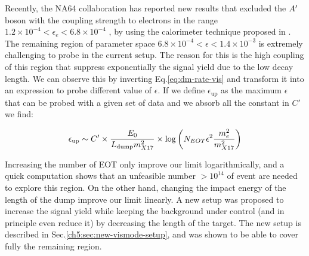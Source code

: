 Recently, the NA64 collaboration has reported new results that excluded the $A'$ boson  with the coupling strength  to electrons in the range $1.2 \times 10^{-4} < \epsilon_e < 6.8 \times 10^{-4}$ \cite{Banerjee:2018vgk,Banerjee:2019hmi}, by using the calorimeter technique proposed in \cite{Gninenko:2013rka,Andreas:2013lya}. The remaining region of parameter space $6.8 \times 10^{-4} < \epsilon < 1.4 \times 10^{-3}$ is extremely challenging to probe in the current setup. The reason for this is the high coupling of this region that suppress exponentially the signal yield due to the low decay length. We can observe this by inverting Eq.\ref{eq:dm-rate-vis} and transform it into an expression to probe different value of $\epsilon$. If we define $\epsilon_{\textrm{up}}$ as the maximum $\epsilon$ that can be probed with a given set of data and we absorb all the constant in $C'$ we find:

\begin{equation}
  \label{eq:x17-coverage}
  \epsilon_{\textrm{up}} \sim C' \times \frac{E_0}{L_{\textrm{dump}}m^2_{X17}} \times \log{\left(N_{EOT} \epsilon^2 \frac{m_e^2}{m_{X17}^2}\right)}
\end{equation}

Increasing the number of EOT only improve our limit logarithmically, and a quick computation shows that an unfeasible number $>10^{14}$ of event are needed to explore this region. On the other hand, changing the impact energy of the length of the dump improve our limit linearly. A new setup was proposed to increase the signal yield while keeping the background under control (and in principle even reduce it) by decreasing the length of the target. The new setup is described in Sec.\ref{ch5:sec:new-vismode-setup}, and was shown to be able to cover fully the remaining region.


